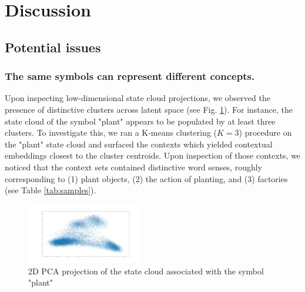 \section{Discussion}\label{sec:discussion}

\subsection{Potential issues}

\subsubsection{The same symbols can represent different concepts.}

Upon inspecting low-dimensional state cloud projections, we observed the presence of distinctive clusters across latent space (see Fig. \ref{fig:plant}). For instance, the state cloud of the symbol "plant" appears to be populated by at least three clusters. To investigate this, we ran a K-means clustering ($K=3$) procedure on the "plant" state cloud and surfaced the contexts which yielded contextual embeddings closest to the cluster centroids. Upon inspection of those contexts, we noticed that the context sets contained distinctive word senses, roughly corresponding to (1) plant objects, (2) the action of planting, and (3) factories (see Table \ref{tab:samples}).

\begin{figure}[h]
    \centering
    \includegraphics[width=0.45\textwidth]{img/plant.png}
    \caption{2D PCA projection of the state cloud associated with the symbol "plant"}\label{fig:plant}
\end{figure}

